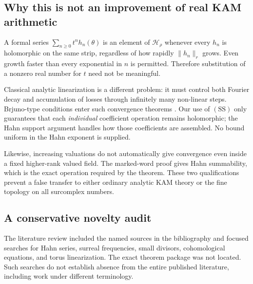 \documentclass[11pt,letterpaper]{article}
\theoremstyle{definition}
\theoremstyle{remark}
\newcommand{\HH}{\mathcal H}
\newcommand{\SDcond}{\mathrm{SS}}
\numberwithin{equation}{section}
\begin{document}
\subsection{Why this is not an improvement of real KAM arithmetic}

A formal series $\sum_{n\ge0}t^n h_n(\theta)$ is an element of $\HH_\rho$
whenever every $h_n$ is holomorphic on the same strip, regardless of how
rapidly $\|h_n\|_r$ grows.  Even growth faster than every exponential in $n$
is permitted.  Therefore substitution of a nonzero real number for $t$
need not be meaningful.

Classical analytic linearization is a different problem: it must control
both Fourier decay and accumulation of losses through infinitely many
non-linear steps.  Brjuno-type conditions enter such convergence theorems
\cite{bounemoura,chevallier}.  Our use of $(\SDcond)$ only guarantees that each
\emph{individual} coefficient operation remains holomorphic; the Hahn
support argument handles how those coefficients are assembled.  No bound
uniform in the Hahn exponent is supplied.

Likewise, increasing valuations do not automatically give convergence even
inside a fixed higher-rank valued field.  The marked-word proof gives Hahn
summability, which is the exact operation required by the theorem.  These
two qualifications prevent a false transfer to either ordinary analytic KAM
theory or the fine topology on all surcomplex numbers.

\subsection{A conservative novelty audit}

The literature review included the named sources in the bibliography and
focused searches for Hahn series, surreal frequencies, small divisors,
cohomological equations, and torus linearization.  The exact theorem package
was not located.  Such searches do not establish absence from the entire
published literature, including work under different terminology.
\end{document}
